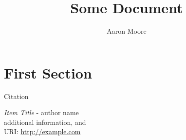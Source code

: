 \documentclass{article}
\title{Some Document}
\author{Aaron Moore}
\date{}
\begin{document}
\maketitle \thispagestyle{fancy}
\section{First Section}
Citation \cite{itemid}\par
\lipsum[1-10]

\pagebreak{}
\begin{thebibliography}{9}
	\emph{Item Title} - author name\\
		additional information, and\\
		URI: \url{http://example.com}
\end{thebibliography}
\end{document}
